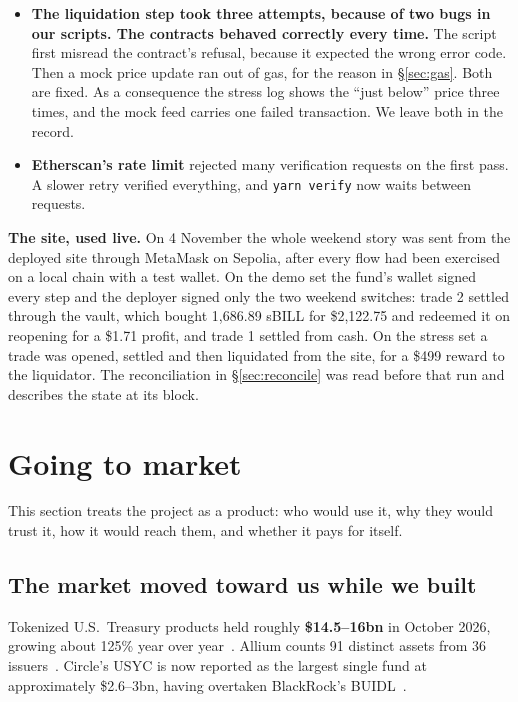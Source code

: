 \documentclass[11pt,a4paper]{article}
\begin{document}
\begin{itemize}
  \item \textbf{The liquidation step took three attempts, because of two bugs in our scripts. The
  contracts behaved correctly every time.} The script first misread the contract's refusal, because
  it expected the wrong error code. Then a mock price update ran out of gas, for the reason in
  \S\ref{sec:gas}. Both are fixed. As a consequence the stress log shows the ``just below'' price
  three times, and the mock feed carries one failed transaction. We leave both in the record.
  \item \textbf{Etherscan's rate limit} rejected many verification requests on the first pass. A
  slower retry verified everything, and \texttt{yarn verify} now waits between requests.
\end{itemize}

\textbf{The site, used live.} On 4 November the whole weekend story was sent from the deployed site
through MetaMask on Sepolia, after every flow had been exercised on a local chain with a test wallet.
On the demo set the fund's wallet signed every step and the deployer signed only the two weekend
switches: trade 2 settled through the vault, which bought 1,686.89 sBILL for \$2,122.75 and redeemed
it on reopening for a \$1.71 profit, and trade 1 settled from cash. On the stress set a trade was
opened, settled and then liquidated from the site, for a \$499 reward to the liquidator. The
reconciliation in \S\ref{sec:reconcile} was read before that run and describes the state at its block.

\section{Going to market}\label{sec:gtm}

This section treats the project as a product: who would use it, why they would trust it, how it
would reach them, and whether it pays for itself.

\subsection{The market moved toward us while we built}

Tokenized U.S.\ Treasury products held roughly \textbf{\$14.5--16bn} in October 2026, growing about
125\% year over year~\cite{allium,cryptonomist,utoday}. Allium counts 91 distinct assets from 36
issuers~\cite{allium}. Circle's USYC is now reported as the largest single fund at approximately
\$2.6--3bn, having overtaken BlackRock's BUIDL~\cite{coincentral}.
\end{document}
